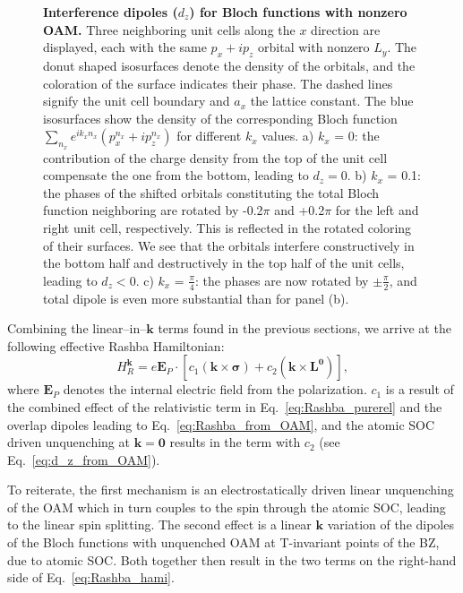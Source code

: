 \begin{figure}
	\centering
{}
\caption{\label{fig:Rashba_interference}{\bf Interference dipoles ($d_z$) for Bloch functions with nonzero OAM.} Three neighboring unit cells along the $x$ direction are displayed, each with the same $p_x + ip_z$ orbital with nonzero $L_y$. The donut shaped isosurfaces denote the density of the orbitals, and the coloration of the surface indicates their phase. The dashed lines signify the unit cell boundary and $a_x$ the lattice constant. The blue isosurfaces show the density of the corresponding Bloch function $\sum_{n_x} e^{i k_x n_x} (p_x^{n_x} + ip_z^{n_x})$ for different $k_x$ values.
a) $k_x$ = 0: the contribution of the charge density from the top of the unit cell compensate the one from the bottom, leading to $d_z=0$.
b) $k_x$ = 0.1: the phases of the shifted orbitals constituting the total Bloch function neighboring are rotated by -0.2$\pi$ and +0.2$\pi$ for the left and right unit cell, respectively. This is reflected in the rotated coloring of their surfaces. We see that the orbitals interfere constructively in the bottom half and destructively in the top half of the unit cells, leading to $d_z<0$.
c) $k_x$ = $\frac{\pi}{4}$: the phases are now rotated by $\pm \frac{\pi}{2}$, and total dipole is even more substantial than for panel (b).}
\end{figure}
    
Combining the linear--in--$\bm k$ terms found in the previous sections, we arrive at the following effective Rashba Hamiltonian:
\begin{equation}
	\label{eq:Rashba_hami}
	H_R^{\bm k} = e \bm{E}_P\cdot \left[c_1(\bm k \times \bm \sigma) + c_2 (\bm k \times \bm{L}^{\bm 0} ) \right],
\end{equation}
where $\bm{E}_P$ denotes the internal electric field from the polarization.
$c_1$ is a result of the combined effect of the relativistic term in Eq.~\eqref{eq:Rashba_purerel} and the overlap dipoles leading to Eq.~\eqref{eq:Rashba_from_OAM}, and the atomic SOC driven unquenching at $\bm k = \bm 0$ results in the term with $c_2$ (see Eq.~\eqref{eq:d_z_from_OAM}).

To reiterate, the first mechanism is an electrostatically driven linear unquenching of the OAM which in turn couples to the spin through the atomic SOC, leading to the linear spin splitting.
The second effect is a linear $\bm k$ variation of the dipoles of the Bloch functions with unquenched OAM at T-invariant points of the BZ, due to atomic SOC. Both together then result in the two terms on the right-hand side of Eq.~\eqref{eq:Rashba_hami}. 
    
